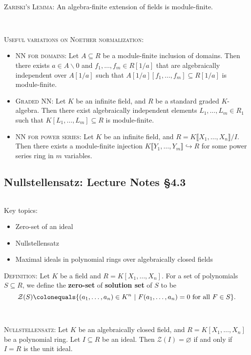 \documentclass[12pt]{amsart}
\newcommand{\cZ}{\mathcal{Z}}
\newcommand{\0}{$\phantom{.}$}
\newcommand{\1}{\mathbbm{1}}
\newcommand\ceq{\colonequals}
\begin{document}
\


\noindent \textsc{Zariski's Lemma:} An algebra-finite extension of fields is module-finite.

\

\noindent \textsc{Useful variations on Noether normalization:}
\begin{itemize}
\item \textsc{NN for domains:} Let $A\subseteq R$ be a module-finite inclusion of domains\footnotemark. Then there exists $a\in A\smallsetminus 0$ and $f_1,\dots,f_m\in R[1/a]$ that are algebraically independent over $A[1/a]$ such that $A[1/a][f_1,\dots,f_m] \subseteq R[1/a]$ is module-finite.
\item \textsc{Graded NN:} Let $K$ be an infinite field, and $R$ be a standard graded $K$-algebra. Then there exist algebraically independent elements $L_1,\dots,L_m \in R_1$ such that $K[L_1,\dots,L_m] \subseteq R$ is module-finite.
\item \textsc{NN for power series:} Let $K$ be an infinite field, and $R=K\llbracket X_1,\dots,X_n \rrbracket / I$. Then there exists a module-finite injection $K\llbracket Y_1,\dots,Y_m \rrbracket \hookrightarrow R$ for some power series ring in $m$ variables.
\end{itemize}



\newpage
\subsection{Nullstellensatz: Lecture Notes \S4.3} \0

\begin{framed} Key topics:
\begin{itemize}
\item Zero-set of an ideal
\item Nullstellensatz
\item Maximal ideals in polynomial rings over algebraically closed fields
\end{itemize}
\end{framed}

\noindent \textsc{Definition:} Let $K$ be a field and $R=K[X_1,\dots,X_n]$. For a set of polynomials $S\subseteq R$, we define the \textbf{zero-set} of \textbf{solution set} of $S$ to be
\[ \cZ(S) \ceq \{ (a_1,\dots,a_n)\in K^n \ | \ F(a_1,\dots,a_n)=0 \ \text{for all} \ F\in S\}.\]

\

\noindent \textsc{Nullstellensatz:} Let $K$ be an algebraically closed field, and $R=K[X_1,\dots,X_n]$ be a polynomial ring. Let $I\subseteq R$ be an ideal. Then $\cZ(I)=\varnothing$ if and only if $I=R$ is the unit ideal. 
\end{document}
